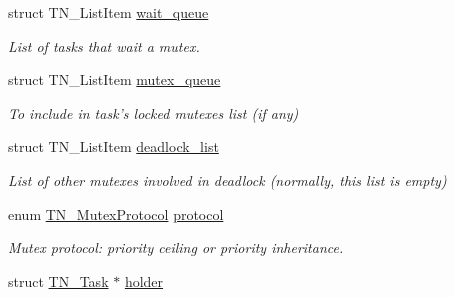\begin{DoxyCompactItemize}
\item 
\hypertarget{structTN__Mutex_a65bc07cade239063ba47a140a7d46a92}{struct T\+N\+\_\+\+List\+Item \hyperlink{structTN__Mutex_a65bc07cade239063ba47a140a7d46a92}{wait\+\_\+queue}}\label{structTN__Mutex_a65bc07cade239063ba47a140a7d46a92}

\begin{DoxyCompactList}\small\item\em List of tasks that wait a mutex. \end{DoxyCompactList}\item 
\hypertarget{structTN__Mutex_a3d9a36e9441d047a4ec04878cf4ca2fd}{struct T\+N\+\_\+\+List\+Item \hyperlink{structTN__Mutex_a3d9a36e9441d047a4ec04878cf4ca2fd}{mutex\+\_\+queue}}\label{structTN__Mutex_a3d9a36e9441d047a4ec04878cf4ca2fd}

\begin{DoxyCompactList}\small\item\em To include in task's locked mutexes list (if any) \end{DoxyCompactList}\item 
\hypertarget{structTN__Mutex_afd61f3a49d4c2538a6784e2202893e47}{struct T\+N\+\_\+\+List\+Item \hyperlink{structTN__Mutex_afd61f3a49d4c2538a6784e2202893e47}{deadlock\+\_\+list}}\label{structTN__Mutex_afd61f3a49d4c2538a6784e2202893e47}

\begin{DoxyCompactList}\small\item\em List of other mutexes involved in deadlock (normally, this list is empty) \end{DoxyCompactList}\item 
\hypertarget{structTN__Mutex_a94cb6bc95a05bfd95c0a088c56712bab}{enum \hyperlink{tn__mutex_8h_a11357f7bb31a3b380cbe94e0913a5b40}{T\+N\+\_\+\+Mutex\+Protocol} \hyperlink{structTN__Mutex_a94cb6bc95a05bfd95c0a088c56712bab}{protocol}}\label{structTN__Mutex_a94cb6bc95a05bfd95c0a088c56712bab}

\begin{DoxyCompactList}\small\item\em Mutex protocol\+: priority ceiling or priority inheritance. \end{DoxyCompactList}\item 
\hypertarget{structTN__Mutex_ae182682fa0d571716d03ce13e667254c}{struct \hyperlink{structTN__Task}{T\+N\+\_\+\+Task} $\ast$ \hyperlink{structTN__Mutex_ae182682fa0d571716d03ce13e667254c}{holder}}\label{structTN__Mutex_ae182682fa0d571716d03ce13e667254c}


\end{DoxyCompactItemize}
